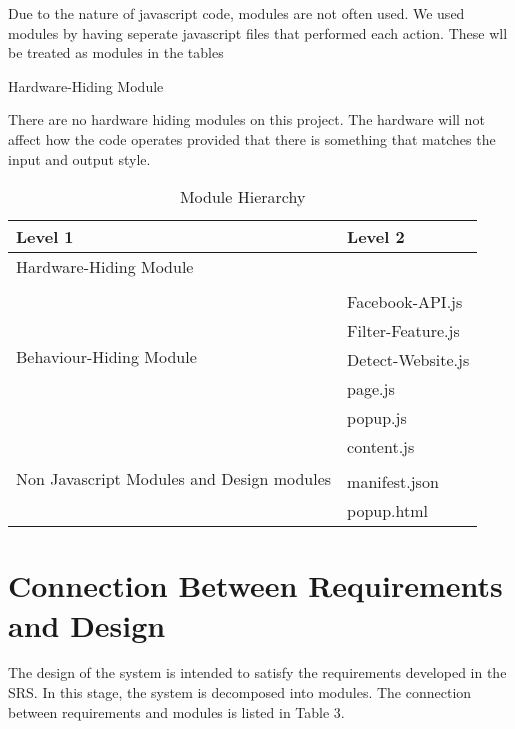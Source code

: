 \documentclass[12pt, titlepage]{article}
\newcounter{mnum}
\newcommand{\mthemnum}{M\themnum}
\begin{document}
Due to the nature of javascript code, modules are not often used. We used modules by having seperate javascript files that performed each action. These wll be treated as modules in the tables
\begin{description}
\item [ \mthemnum \label{mHH}:] Hardware-Hiding Module
\item There are no hardware hiding modules on this project. The hardware will not affect how the code operates provided that there is something that matches the input and output style. 
\end{description}
\begin{table}[h!]
\centering
\begin{tabular}{p{} p{}}
\toprule
\textbf{Level 1} & \textbf{Level 2}\\
\midrule
{Hardware-Hiding Module} & ~ \\
\midrule
\multirow{6}{0.3\textwidth}{Behaviour-Hiding Module}\\ %
& Facebook-API.js\\
&Filter-Feature.js\\
&Detect-Website.js\\
& page.js\\
& popup.js\\
& content.js\\
\midrule
\multirow{2}{0.3\textwidth}{Non Javascript Modules and Design modules}\\ %
& manifest.json\\
& popup.html \\
\bottomrule
\end{tabular}
\caption{Module Hierarchy}
\label{TblMH}
\end{table}
\section{Connection Between Requirements and Design} \label{SecConnection}
The design of the system is intended to satisfy the requirements developed in
the SRS. In this stage, the system is decomposed into modules. The connection
between requirements and modules is listed in Table 3.
\end{document}
